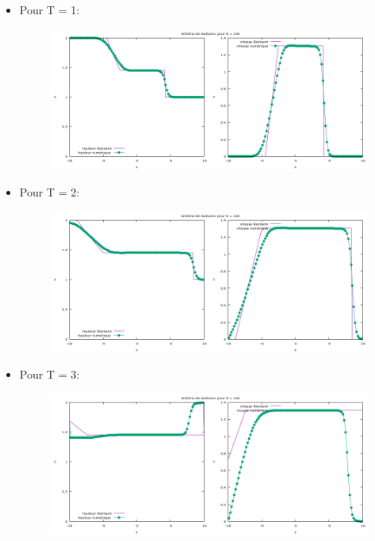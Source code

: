 \begin{itemize}
\begin{itemize}
\item Pour T = 1:

\begin{figure}[h!]
	\centering \includegraphics[scale=0.5]{Images_Fichiers/tp2godu100_1.png}
\end{figure}

\newpage
\item Pour T = 2:

\begin{figure}[h!]
	\centering \includegraphics[scale=0.5]{Images_Fichiers/tp2godu100_2.png}
\end{figure}

\item Pour T = 3:

\begin{figure}[h!]
	\centering \includegraphics[scale=0.5]{Images_Fichiers/tp2godu100_3.png}
\end{figure}


\end{itemize}
\end{itemize}
